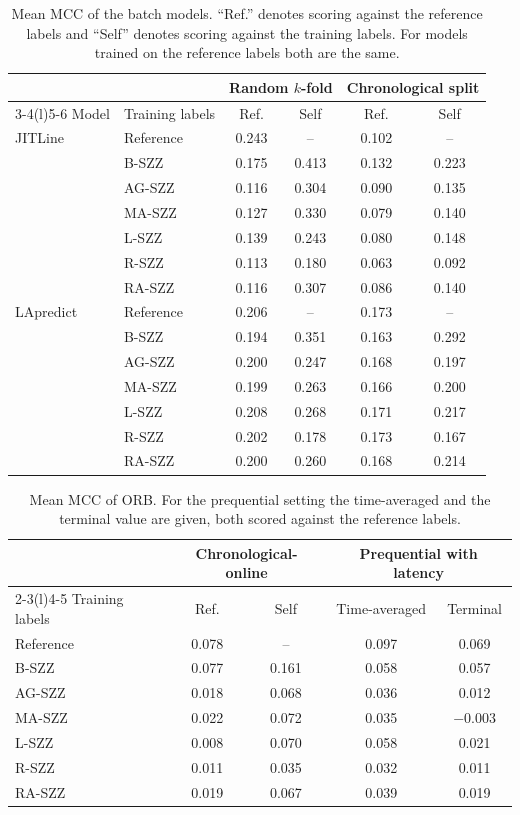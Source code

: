 \documentclass[12pt,a4paper,oneside]{report}
\begin{document}
\begin{table}[htbp]
\centering\small
\caption{Mean MCC of the batch models. ``Ref.'' denotes scoring against the
reference labels and ``Self'' denotes scoring against the training labels.
For models trained on the reference labels both are the same.}
\label{tab:mcc-batch}
\begin{tabular}{@{}llcccc@{}}
\toprule
 & & \multicolumn{2}{c}{Random $k$-fold} & \multicolumn{2}{c}{Chronological split} \\
\cmidrule(lr){3-4}\cmidrule(l){5-6}
Model & Training labels & Ref. & Self & Ref. & Self \\
\midrule
JITLine & Reference & 0.243 & -- & 0.102 & -- \\
 & B-SZZ & 0.175 & 0.413 & 0.132 & 0.223 \\
 & AG-SZZ & 0.116 & 0.304 & 0.090 & 0.135 \\
 & MA-SZZ & 0.127 & 0.330 & 0.079 & 0.140 \\
 & L-SZZ & 0.139 & 0.243 & 0.080 & 0.148 \\
 & R-SZZ & 0.113 & 0.180 & 0.063 & 0.092 \\
 & RA-SZZ & 0.116 & 0.307 & 0.086 & 0.140 \\
\midrule
LApredict & Reference & 0.206 & -- & 0.173 & -- \\
 & B-SZZ & 0.194 & 0.351 & 0.163 & 0.292 \\
 & AG-SZZ & 0.200 & 0.247 & 0.168 & 0.197 \\
 & MA-SZZ & 0.199 & 0.263 & 0.166 & 0.200 \\
 & L-SZZ & 0.208 & 0.268 & 0.171 & 0.217 \\
 & R-SZZ & 0.202 & 0.178 & 0.173 & 0.167 \\
 & RA-SZZ & 0.200 & 0.260 & 0.168 & 0.214 \\
\bottomrule
\end{tabular}
\end{table}

\begin{table}[htbp]
\centering\small
\caption{Mean MCC of ORB. For the prequential setting the time-averaged and
the terminal value are given, both scored against the reference labels.}
\label{tab:mcc-orb}
\begin{tabular}{@{}lcccc@{}}
\toprule
 & \multicolumn{2}{c}{Chronological-online} & \multicolumn{2}{c}{Prequential with latency} \\
\cmidrule(lr){2-3}\cmidrule(l){4-5}
Training labels & Ref. & Self & Time-averaged & Terminal \\
\midrule
Reference & 0.078 & -- & 0.097 & 0.069 \\
B-SZZ & 0.077 & 0.161 & 0.058 & 0.057 \\
AG-SZZ & 0.018 & 0.068 & 0.036 & 0.012 \\
MA-SZZ & 0.022 & 0.072 & 0.035 & $-$0.003 \\
L-SZZ & 0.008 & 0.070 & 0.058 & 0.021 \\
R-SZZ & 0.011 & 0.035 & 0.032 & 0.011 \\
RA-SZZ & 0.019 & 0.067 & 0.039 & 0.019 \\
\bottomrule
\end{tabular}
\end{table}
\end{document}
